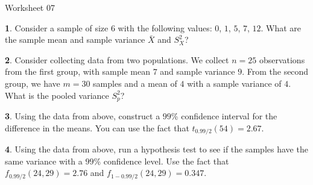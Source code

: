 \documentclass{tufte-handout}
\begin{document}
\justify

{\LARGE Worksheet 07}

\vspace*{18pt}


\textbf{1}. Consider a sample of size $6$ with the following values: $0$, $1$, $5$, $7$, $12$.
What are the sample mean and sample variance $\bar{X}$ and $S^2_X$?


\textbf{2}. Consider collecting data from two populations. We collect $n=25$ observations
from the first group, with sample mean $7$ and sample variance $9$. From the 
second group, we have $m=30$ samples and a mean of $4$ with a sample variance
of $4$. What is the pooled variance $S^2_p$?

\textbf{3}. Using the data from above, construct a $99$\% confidence interval for the 
difference in the means. You can use the fact that $t_{0.99/2}(54) = 2.67$. 


\textbf{4}. Using the data from above, run a hypothesis test to see if the samples have the
same variance with a $99$\% confidence level. Use the fact that
$f_{0.99/2}(24, 29) = 2.76$ and $f_{1-0.99/2}(24, 29) = 0.347$. 

\end{document}
